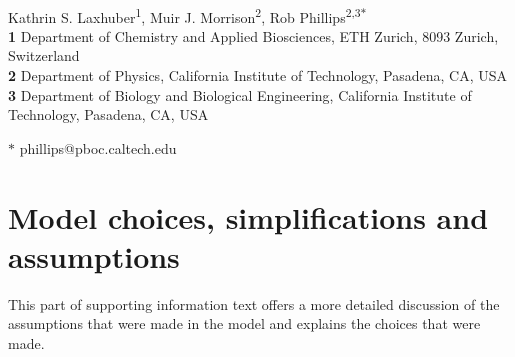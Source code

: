 \documentclass[10pt,letterpaper]{article}
\begin{document}
	
\begin{flushleft}
	{\Large
		\textbf{}
	}
	\newline
		\\
	Kathrin S. Laxhuber\textsuperscript{1},
	Muir J. Morrison\textsuperscript{2},
	Rob Phillips\textsuperscript{2,3$\ast$}
	\\
	\bigskip
	\textbf{1} Department of Chemistry and Applied Biosciences, ETH Zurich, 8093 Zurich, Switzerland
	\\
	\textbf{2} Department of Physics, California Institute of Technology, Pasadena, CA, USA
	\\
	\textbf{3} Department of Biology and Biological Engineering, California Institute of Technology, Pasadena, CA, USA
	\\
	\bigskip
	
	
	
	
	
	
	$\ast$ phillips@pboc.caltech.edu
	
\end{flushleft}	

\newpage
\linenumbers

\section{Model choices, simplifications and assumptions}
This part of supporting information text offers a more detailed discussion of the assumptions that were made in the model and explains the choices that were made.
\end{document}

